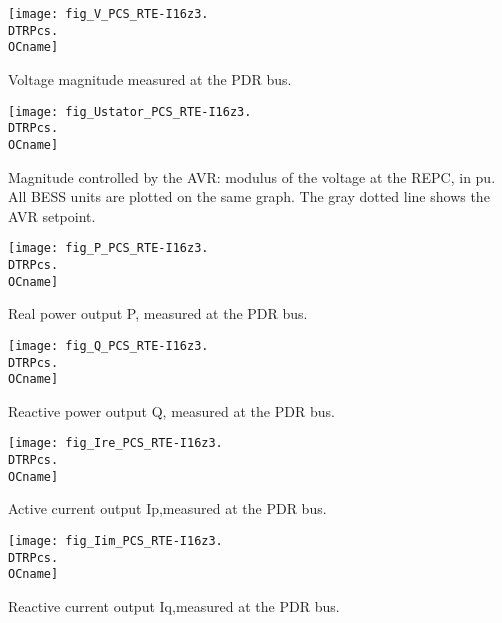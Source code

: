 {%
    \noindent
    \begin{minipage}[t]{0.48\textwidth}
        \centering
        \texttt{[image: fig\_V\_PCS\_RTE-I16z3.\\DTRPcs.\\OCname]}
        \begin{minipage}[t]{0.8\textwidth}
            \small Voltage magnitude measured at the PDR bus.
        \end{minipage}
    \end{minipage}
    \hfill
    \begin{minipage}[t]{0.48\textwidth}
        \centering
        \texttt{[image: fig\_Ustator\_PCS\_RTE-I16z3.\\DTRPcs.\\OCname]}
        \begin{minipage}[t]{0.8\textwidth}
            \small Magnitude controlled by the AVR: modulus of the voltage
            at the REPC, in pu. All BESS units are plotted on the same graph.
            The gray dotted line shows the AVR setpoint.
        \end{minipage}
    \end{minipage}
%
    \vspace{0.5cm}
    \begin{minipage}[t]{0.48\textwidth}
        \centering
        \texttt{[image: fig\_P\_PCS\_RTE-I16z3.\\DTRPcs.\\OCname]}
        \begin{minipage}[t]{0.8\textwidth}
            \small Real power output P, measured at the PDR bus.
        \end{minipage}
    \end{minipage}
    \hfill
    \begin{minipage}[t]{0.48\textwidth}
        \centering
        \texttt{[image: fig\_Q\_PCS\_RTE-I16z3.\\DTRPcs.\\OCname]}
        \begin{minipage}[t]{0.8\textwidth}
            \small Reactive power output Q, measured at the PDR bus.
        \end{minipage}
    \end{minipage}
%
    \vspace{0.5cm}
    \begin{minipage}[t]{0.48\textwidth}
        \centering
        \texttt{[image: fig\_Ire\_PCS\_RTE-I16z3.\\DTRPcs.\\OCname]}
        \begin{minipage}[t]{0.8\textwidth}
            \small Active current output Ip,measured at the PDR bus.
        \end{minipage}
    \end{minipage}
    \hfill
    \begin{minipage}[t]{0.48\textwidth}
        \centering
        \texttt{[image: fig\_Iim\_PCS\_RTE-I16z3.\\DTRPcs.\\OCname]}
        \begin{minipage}[t]{0.8\textwidth}
            \small Reactive current output Iq,measured at the PDR bus.
        \end{minipage}
    \end{minipage}
}
